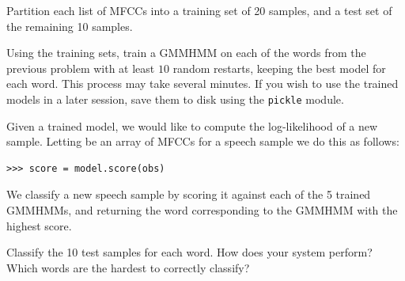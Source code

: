 \begin{problem}
Partition each list of MFCCs into a training set of 20 samples, and a test set of the remaining 10 samples.

Using the training sets, train a GMMHMM on each of the words from the previous problem with at least $10$ random restarts, keeping the best model for each word.
This process may take several minutes. If you wish to use the trained models in a later session, save them to disk using the {\tt pickle} module.
\end{problem}

Given a trained model, we would like to compute the log-likelihood of a new sample.
Letting  be an array of MFCCs for a speech sample we do this as follows:
\begin{lstlisting}
>>> score = model.score(obs)
\end{lstlisting}
We classify a new speech sample by scoring it against each of the 5 trained GMMHMMs, and returning the word corresponding to the GMMHMM with the highest score.
\begin{problem}
Classify the 10 test samples for each word.
How does your system perform? Which words are the hardest to correctly classify?
\end{problem}
























